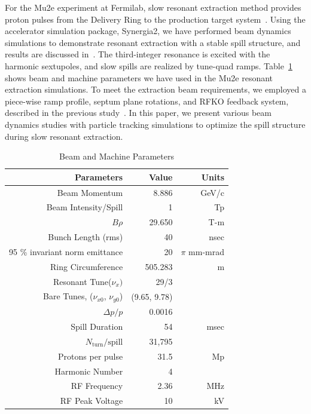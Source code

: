 \documentclass[review,1p,number,fleqn,a4paper]{elsarticle}
\begin{document}
For the Mu2e experiment at Fermilab, slow resonant extraction method provides proton pulses from the Delivery Ring to the production target system~\cite{tdr}. Using the accelerator simulation package, Synergia2, we have performed beam dynamics simulations to demonstrate resonant extraction with a stable spill structure, and results are discussed in~\cite{mu2e}. The third-integer resonance is excited with the harmonic sextupoles, and slow spills are realized by tune-quad ramps. Table~\ref{table:param} shows beam and machine parameters we have used in the Mu2e resonant extraction simulations. To meet the extraction beam requirements, we employed a piece-wise ramp profile, septum plane rotations, and RFKO feedback system, described in the previous study~\cite{mu2e}. In this paper, we present various beam dynamics studies with particle tracking simulations to optimize the spill structure during slow resonant extraction. 


\begin{table}[hbp]
  \centering
    \begin{tabular}{rrr}
    \hline
      Parameters                             & Value          & Units         \\
    \hline
      Beam Momentum                          & 8.886          & GeV/c         \\
      Beam Intensity/Spill                   & 1              & Tp            \\
      $B \rho$                               & 29.650         & T-m           \\
      Bunch Length (rms)                     & 40             & nsec          \\
      95 \% invariant norm emittance         & 20             & $\pi$ mm-mrad \\
      Ring Circumference                     & 505.283        & m             \\
      Resonant Tune($\nu_{x})$               & 29/3           &               \\
      Bare Tunes, ($\nu_{x0}$, $\nu_{y0}$)   & (9.65, 9.78)   &               \\
      $\Delta p / p$                         & 0.0016         &               \\
      Spill Duration                         &  54            & msec          \\
      $N_{\text{turn}} / {\text{spill}}$     & 31,795         &               \\
      Protons per pulse                      & 31.5           & Mp            \\
      Harmonic Number                        & 4              &               \\
      RF Frequency                           & 2.36           & MHz           \\
      RF Peak Voltage                        & 10             & kV            \\
    \hline
    \end{tabular}
    \caption{\label{table:param}Beam and Machine Parameters}
\end{table}
\end{document}
